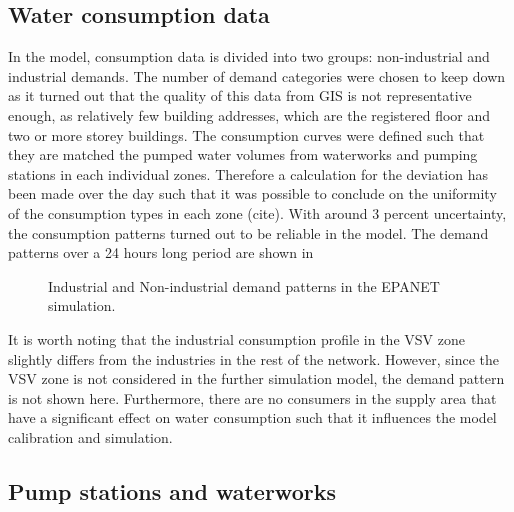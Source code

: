 \subsection{Water consumption data}
\label{water_consumption_data}

In the model, consumption data is divided into two groups: non-industrial and industrial demands. The number of demand categories were chosen to keep down as it turned out that the quality of this data from GIS is not representative enough, as relatively few building addresses, which are the registered floor and  two or more storey buildings. The consumption curves were defined such that they are matched the pumped water volumes from waterworks and pumping stations in each individual zones. Therefore a calculation for the deviation has been made over the day such that it was possible to conclude on the uniformity of the consumption types in each zone (cite). With around 3 percent uncertainty, the consumption patterns turned out to be reliable in the model. The demand patterns over a 24 hours long period are shown in  

\begin{figure}[H]
\centering

\caption{Industrial and Non-industrial demand patterns in the EPANET simulation.}
\label{fig:demandpatterns_EPANET}
\end{figure}

It is worth noting that the industrial consumption profile in the VSV zone slightly differs from the industries in the rest of the network. However, since the VSV zone is not considered in the further simulation model, the demand pattern is not shown here. Furthermore, there are no consumers in the supply area that have a significant effect on water consumption such that it influences the model calibration and simulation. 

\subsection{Pump stations and waterworks}
\label{pump_stations_andwaterworks}


